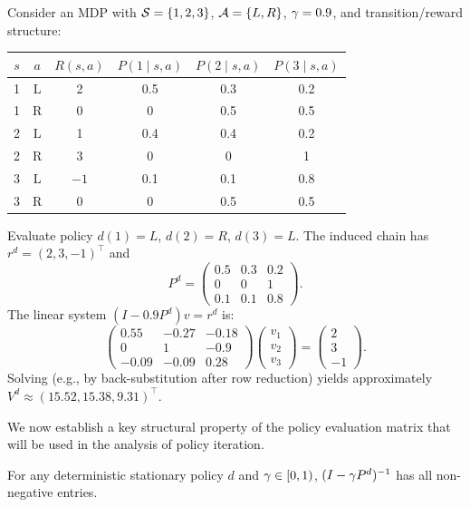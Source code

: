 \documentclass[11pt,a4paper]{article}
\begin{document}
\begin{example}
\label{ex:eval-three-state}
Consider an MDP with $\mathcal{S} = \{1, 2, 3\}$,
$\mathcal{A} = \{L, R\}$, $\gamma = 0.9$, and transition/reward
structure:
\begin{center}
\begin{tabular}{cccccc}
\toprule
$s$ & $a$ & $R(s,a)$ & $P(1 \mid s,a)$ & $P(2 \mid s,a)$ &
$P(3 \mid s,a)$ \\
\midrule
1 & L & 2 & 0.5 & 0.3 & 0.2 \\
1 & R & 0 & 0 & 0.5 & 0.5 \\
2 & L & 1 & 0.4 & 0.4 & 0.2 \\
2 & R & 3 & 0 & 0 & 1 \\
3 & L & $-1$ & 0.1 & 0.1 & 0.8 \\
3 & R & 0 & 0 & 0.5 & 0.5 \\
\bottomrule
\end{tabular}
\end{center}

Evaluate policy $d(1) = L$, $d(2) = R$, $d(3) = L$. The induced
chain has $r^d = (2, 3, -1)^\top$ and
\[
    P^d = \begin{pmatrix}
    0.5 & 0.3 & 0.2 \\
    0 & 0 & 1 \\
    0.1 & 0.1 & 0.8
    \end{pmatrix}.
\]
The linear system $(I - 0.9 P^d) v = r^d$ is:
\[
    \begin{pmatrix}
    0.55 & -0.27 & -0.18 \\
    0 & 1 & -0.9 \\
    -0.09 & -0.09 & 0.28
    \end{pmatrix}
    \begin{pmatrix} v_1 \\ v_2 \\ v_3 \end{pmatrix}
    = \begin{pmatrix} 2 \\ 3 \\ -1 \end{pmatrix}.
\]
Solving (e.g., by back-substitution after row reduction) yields
approximately $V^d \approx (15.52, 15.38, 9.31)^\top$.
\end{example}

We now establish a key structural property of the policy evaluation
matrix that will be used in the analysis of policy iteration.

\begin{proposition}
\label{prop:fundamental-nonneg}
For any deterministic stationary policy $d$ and $\gamma \in [0,1)$,
$(I - \gamma P^d)^{-1}$ has all non-negative entries.
\end{proposition}
\end{document}
